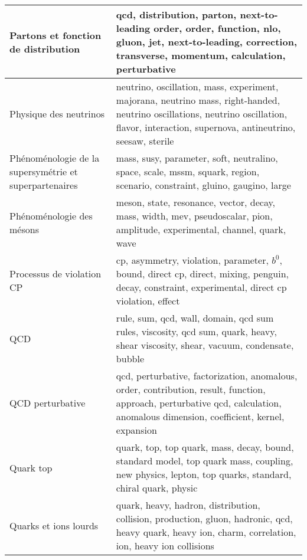 \begin{longtable}[H]{p{}|p{}}
Partons et fonction de distribution                             &                                           qcd, distribution, parton, next-to-leading order, order, function, nlo, gluon, jet, next-to-leading, correction, transverse, momentum, calculation, perturbative \\ \midrule
Physique des neutrinos                                          &                 neutrino, oscillation, mass, experiment, majorana, neutrino mass, right-handed, neutrino oscillations, neutrino oscillation, flavor, interaction, supernova, antineutrino, seesaw, sterile \\ \midrule
Phénoménologie de la supersymétrie et superpartenaires          &                                                                                  mass, susy, parameter, soft, neutralino, space, scale, mssm, squark, region, scenario, constraint, gluino, gaugino, large \\ \midrule
Phénoménologie des mésons                                       &                                                                                meson, state, resonance, vector, decay, mass, width, mev, pseudoscalar, pion, amplitude, experimental, channel, quark, wave \\ \midrule
Processus de violation CP                                       &                                                        cp, asymmetry, violation, parameter, $b^0$, bound, direct cp, direct, mixing, penguin, decay, constraint, experimental, direct cp violation, effect \\ \midrule
QCD                                                             &                                                                          rule, sum, qcd, wall, domain, qcd sum rules, viscosity, qcd sum, quark, heavy, shear viscosity, shear, vacuum, condensate, bubble \\ \midrule
QCD perturbative                                                &                           qcd, perturbative, factorization, anomalous, order, contribution, result, function, approach, perturbative qcd, calculation, anomalous dimension, coefficient, kernel, expansion \\ \midrule
Quark top                                                       &                                                       quark, top, top quark, mass, decay, bound, standard model, top quark mass, coupling, new physics, lepton, top quarks, standard, chiral quark, physic \\ \midrule
Quarks et ions lourds                                           &                                                     quark, heavy, hadron, distribution, collision, production, gluon, hadronic, qcd, heavy quark, heavy ion, charm, correlation, ion, heavy ion collisions \\ \midrule

\end{longtable}
